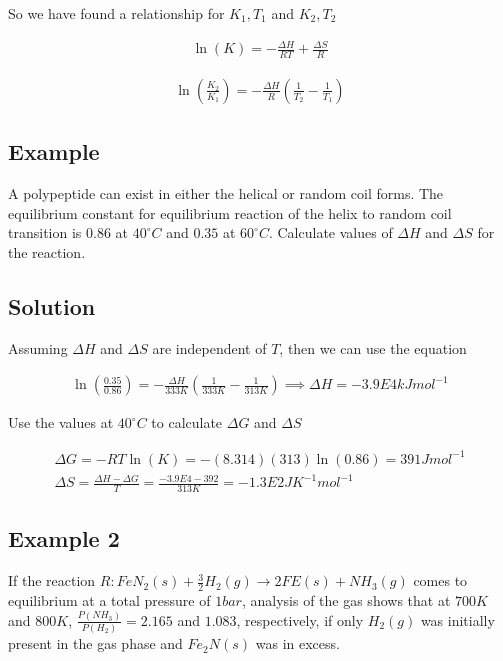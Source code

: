 \documentclass[12pt]{book}
\begin{document}
So we have found a relationship for $K_1, T_1$ and $K_2, T_2$

\begin{align}
    \ln(K)=-\frac{\Delta H}{RT}+\frac{\Delta S}{R}
\end{align}

\begin{align}
    \ln\left(\frac{K_2}{K_1}\right)=-\frac{\Delta H}{R}\left(\frac{1}{T_2}-\frac{1}{T_1}\right)
\end{align}

\subsection*{Example}

A polypeptide can exist in either the helical or random coil forms. The
equilibrium constant for equilibrium reaction of the helix to random coil
transition is $0.86$ at $40 ^{\circ}C$ and $0.35$ at $60^{\circ}C$. Calculate values of $\Delta H$ and $\Delta S$ for
the reaction.

\subsection*{Solution}

Assuming $\Delta H$ and $\Delta S$ are independent of $T$, then we can use the equation

\begin{align*}
    \ln\left(\frac{0.35}{0.86}\right)=-\frac{\Delta H}{333K}\left(\frac{1}{333K}-\frac{1}{313K}\right)\implies \Delta H=-3.9E4 kJmol^{-1}
\end{align*}

Use the values at $40^{\circ} C$ to calculate $\Delta G$ and $\Delta S$

\begin{align*}
    \Delta G=-RT\ln(K)=-(8.314)(313)\ln(0.86)=391Jmol^{-1}\\
    \Delta S=\frac{\Delta H-\Delta G}{T}=\frac{-3.9E4-392}{313K}=-1.3E2JK^{-1}mol^{-1}
\end{align*}

\subsection*{Example 2}

If the reaction $R:FeN_2(s)+\frac{3}{2}H_2(g)\rightarrow 2FE(s)+NH_3(g)$ comes to equilibrium at a total pressure of $1 bar$, analysis of the gas shows that at
$700K$ and $800K$, $\frac{P(NH_3)}{P(H_2)} = 2.165$ and $1.083$, respectively, if only $H_2(g)$ was initially
present in the gas phase and $Fe_2N(s)$ was in excess.
\end{document}
